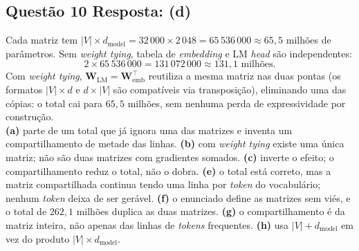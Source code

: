 \documentclass[11pt,a4paper]{article}
\begin{document}
\subsection*{Questão 10 \textemdash{} Resposta: (d)}
Cada matriz tem $|V| \times d_\text{model} = 32\,000 \times 2\,048 = 65\,536\,000 \approx 65{,}5$ milhões de parâmetros. Sem \textit{weight tying}, tabela de \textit{embedding} e LM \textit{head} são independentes:
\[
2 \times 65\,536\,000 = 131\,072\,000 \approx 131{,}1 \text{ milhões}.
\]
Com \textit{weight tying}, $\mathbf{W}_\text{LM} = \mathbf{W}_\text{emb}^\top$ reutiliza a mesma matriz nas duas pontas (os formatos $|V| \times d$ e $d \times |V|$ são compatíveis via transposição), eliminando uma das cópias: o total cai para $65{,}5$ milhões, sem nenhuma perda de expressividade por construção.\\
\textbf{(a)} parte de um total que já ignora uma das matrizes e inventa um compartilhamento de metade das linhas.
\textbf{(b)} com \textit{weight tying} existe uma única matriz; não são duas matrizes com gradientes somados.
\textbf{(c)} inverte o efeito; o compartilhamento reduz o total, não o dobra.
\textbf{(e)} o total está correto, mas a matriz compartilhada continua tendo uma linha por \textit{token} do vocabulário; nenhum \textit{token} deixa de ser gerável.
\textbf{(f)} o enunciado define as matrizes sem viés, e o total de $262{,}1$ milhões duplica as duas matrizes.
\textbf{(g)} o compartilhamento é da matriz inteira, não apenas das linhas de \textit{tokens} frequentes.
\textbf{(h)} usa $|V| + d_\text{model}$ em vez do produto $|V| \times d_\text{model}$.

\color{black}
\end{document}

